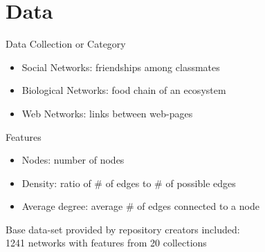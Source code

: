 \documentclass{beamer}
\begin{document}
\section{Data}

\begin{frame}{Data}
Collection or Category
\begin{itemize}
    \item Social Networks: friendships among classmates
    \item Biological Networks: food chain of an ecosystem
    \item Web Networks: links between web-pages
\end{itemize}
Features
\begin{itemize}
    \item Nodes: number of nodes
    \item Density: ratio of \# of edges to \# of possible edges
    \item Average degree: average \# of edges connected to a node
\end{itemize}
\begin{center}
    Base data-set provided by repository creators included:\\
    1241 networks with features from 20 collections
\end{center}
\end{frame}
\end{document}
